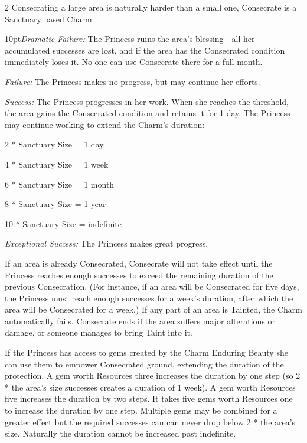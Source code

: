 \begin{multicols}{2}
Consecrating a large area is naturally harder than a small one, Consecrate is a Sanctuary based Charm. 

    \begin{myindentpar}{10pt}\emph{Dramatic Failure:} The Princess ruins the area's blessing - all her accumulated successes are lost, and if the area has the Consecrated  condition immediately loses it. No one can use Consecrate there for a full month.

    \emph{Failure:} The Princess makes no progress, but may continue her efforts.

    \emph{Success:} The Princess progresses in her work. When she reaches the threshold, the area gains the Consecrated condition and retains it for 1 day. The Princess may continue working to extend the Charm's duration:

    2 * Sanctuary Size = 1 day
    
    4 * Sanctuary Size = 1 week
    
    6 * Sanctuary Size = 1 month
    
    8 * Sanctuary Size = 1 year
    
    10 * Sanctuary Size = indefinite 

    \emph{Exceptional Success:} The Princess makes great progress.\end{myindentpar}

\noindent  If an area is already Consecrated, Consecrate will not take effect until the Princess reaches enough successes to exceed the remaining duration of the previous Consecration. (For instance, if an area will be Consecrated for five days, the Princess must reach enough successes for a week's duration, after which the area will be Consecrated for a week.) If any part of an area is Tainted, the Charm automatically fails. Consecrate ends if the area suffers major alterations or damage, or someone manages to bring Taint into it.

If the Princess has access to gems created by the Charm Enduring Beauty she can use them to empower Consecrated ground, extending the duration of the protection. A gem worth Resources three increases the duration by one step (so 2 * the area's size successes creates a duration of 1 week). A gem worth Resources five increases the duration by two steps. It takes five gems worth Resources one to increase the duration by one step. Multiple gems may be combined for a greater effect but the required successes can can never drop below 2 * the area's size. Naturally the duration cannot be increased past indefinite. 


\end{multicols}

